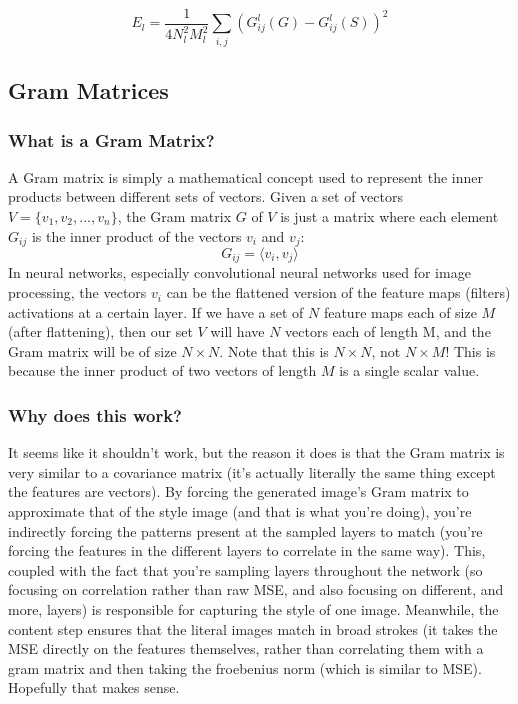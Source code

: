 \documentclass[12pt]{article}
\begin{document}
\begin{equation}
    E_l = \frac{1}{4N_l^2M_l^2} \sum_{i, j} \left( G^l_{ij}(G) - G^l_{ij}(S) \right)^2
\end{equation}

\subsection{Gram Matrices}
\subsubsection{What is a Gram Matrix?}
A Gram matrix is simply a mathematical concept used to represent the inner products between different sets of vectors. Given a set of vectors \(V = \{v_1, v_2, ..., v_n\}\), the Gram matrix \(G\) of \(V\) is just a matrix where each element \(G_{ij}\) is the inner product of the vectors \(v_i\) and \(v_j\):
\[G_{ij} = \langle v_i, v_j \rangle \]
In neural networks, especially convolutional neural networks used for image processing, the vectors \(v_i\) can be the flattened version of the feature maps (filters) activations at a certain layer. If we have a set of  \(N\) feature maps each of size \(M\) (after flattening), then our set \(V\) will have \(N\) vectors each of length M, and the Gram matrix will be of size \(N \times N\). Note that this is \(N \times N\), not \(N \times M\)! This is because the inner product of two vectors of length \(M\) is a single scalar value.
\subsubsection{Why does this work?}
It seems like it shouldn't work, but the reason it does is that the Gram matrix is very similar to a covariance matrix (it's actually literally the same thing except the features are vectors). By forcing the generated image's Gram matrix to approximate that of the style image (and that is what you're doing), you're indirectly forcing the patterns present at the sampled layers to match (you're forcing the features in the different layers to correlate in the same way). This, coupled with the fact that you're sampling layers throughout the network (so focusing on correlation rather than raw MSE, and also focusing on different, and more, layers) is responsible for capturing the style of one image.  Meanwhile, the content step ensures that the literal images match in broad strokes (it takes the MSE directly on the features themselves, rather than correlating them with a gram matrix and then taking the froebenius norm (which is similar to MSE). Hopefully that makes sense.\\
\end{document}

